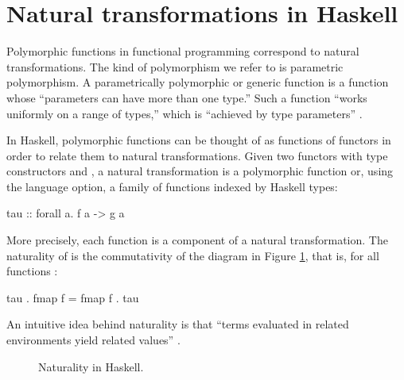\section{Natural transformations in Haskell}
\label{sec:naturals-haskell}

Polymorphic functions in functional programming correspond to natural
transformations. The kind of polymorphism we refer to is parametric
polymorphism. A parametrically polymorphic or generic function is a
function whose ``parameters can have more than one type.'' Such a
function ``works uniformly on a range of types,'' which is ``achieved
by type parameters'' \parencite[476]{cardelli-wegner-1985}.

In Haskell, polymorphic functions can be thought of as functions of
functors in order to relate them to natural transformations. Given two
functors with type constructors  and , a
natural transformation  is a polymorphic function
 or, using the
 language option, a family of functions
indexed by Haskell types:
\begin{codehaskell}
tau :: forall a. f a -> g a
\end{codehaskell}
More precisely, each  function is a component of a
natural transformation. The naturality of  is the
commutativity of the diagram in Figure \ref{fig:naturality-haskell},
that is, for all functions :
\begin{codehaskell}
tau . fmap f = fmap f . tau
\end{codehaskell}
An intuitive idea behind naturality is that ``terms evaluated in
related environments yield related values''
\parencite[347]{wadler-1989}.

\begin{figure}[htb]
  \begin{center}
  \end{center}
  \caption{Naturality in Haskell.}
  \label{fig:naturality-haskell}
\end{figure}

